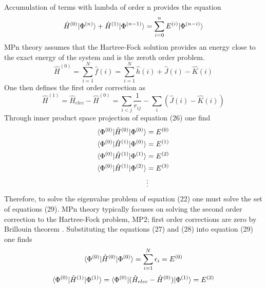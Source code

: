        Accumulation of terms with lambda of order n provides the equation
         \begin{equation}
         	  \hat{H}^{(0)}| \Phi^{(n)} \rangle + \hat{H}^{(1)}| \Phi^{(n-1)} \rangle = \sum_{i=0}^n E^{(i)} | \Phi^{(n-i)} \rangle
        \end{equation}
      MPn theory assumes that the Hartree-Fock solution provides an energy close to the exact energy of the system and is the zeroth order problem.  
        \begin{equation}
        	\hat{H}^{(0)} = \sum_{i=1}^N \hat{f}(i) = \sum_{i=1}^N \hat{h}(i) + \hat{J}(i) - \hat{K}(i)
        \end{equation}
      One then defines the first order correction as 
        \begin{equation}
          \hat{H}^{(1)} = \hat{H}_{elec} - \hat{H}^{(0)} = \sum_{i<j} \frac{1}{r_{ij}} - \sum_i (\hat{J}(i) - \hat{K}(i))
        \end{equation}
      Through inner product space projection of equation (26) one find
        \begin{equation}
          \begin{aligned}
            \langle\Phi^{(0)} |\hat{H}^{(0)}| \Phi^{(0)} \rangle &= E^{(0)}\\
            \langle\Phi^{(0)} |\hat{H}^{(1)}| \Phi^{(0)} \rangle &= E^{(1)}\\
            \langle\Phi^{(0)} |\hat{H}^{(1)}| \Phi^{(1)} \rangle &= E^{(2)}\\
            \langle\Phi^{(0)} |\hat{H}^{(1)}| \Phi^{(2)} \rangle &= E^{(3)}\\
            &\vdots
          \end{aligned}
        \end{equation}
      Therefore, to solve the eigenvalue problem of equation (22) one must solve the set of equations (29).  MPn theory typically focuses on solving the second order correction to the Hartree-Fock problem, MP2; first order corrections are zero by Brillouin theorem \cite{surjan 1989}.  Substituting the equations (27) and (28) into equation (29) one finds
        \begin{equation}
          \langle\Phi^{(0)} |\hat{H}^{(0)}| \Phi^{(0)} \rangle = \sum_{i=1}^N \epsilon_i = E^{(0)}
        \end{equation}
        \begin{equation}
           \langle\Phi^{(0)} |\hat{H}^{(1)}| \Phi^{(1)} \rangle =\langle\Phi^{(0)} |(\hat{H}_{elec} - \hat{H}^{(0)}) | \Phi^{(1)} \rangle  =  E^{(2)}
         \end{equation}
